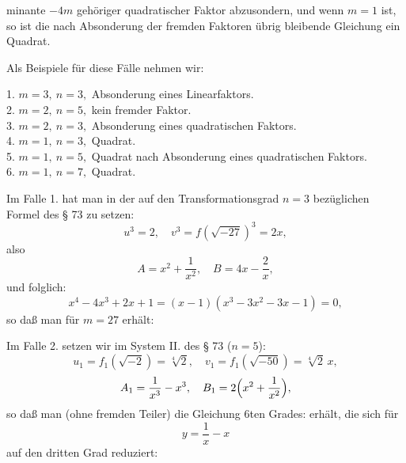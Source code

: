 minante $-4m$ gehöriger quadratischer Faktor abzusondern, und
wenn $m=1$ ist, so ist die nach Absonderung der fremden
Faktoren übrig bleibende Gleichung ein Quadrat.

Als Beispiele für diese Fälle nehmen wir:

1. \quad $m=3,\ n=3,$ \quad Absonderung eines Linearfaktors.\\
2. \quad $m=2,\ n=5,$ \quad kein fremder Faktor.\\
3. \quad $m=2,\ n=3,$ \quad Absonderung eines quadratischen Faktors.\\
4. \quad $m=1,\ n=3,$ \quad Quadrat.\\
5. \quad $m=1,\ n=5,$ \quad Quadrat nach Absonderung eines quadratischen Faktors.\\
6. \quad $m=1,\ n=7,$ \quad Quadrat.

Im Falle 1. hat man in der auf den Transformationsgrad $n=3$
bezüglichen Formel des § 73 zu setzen:
\[
u^3=2,\quad v^3=f(\sqrt{-27})^3=2x,
\]
also
\[
A=x^2+\frac{1}{x^2},\quad B=4x-\frac{2}{x},
\]
und folglich:
\[
x^4-4x^3+2x+1=(x-1)(x^3-3x^2-3x-1)=0,
\]
so daß man für $m=27$ erhält:

Im Falle 2. setzen wir im System II. des § 73 ($n=5$):
\[
u_1=f_1(\sqrt{-2})=\sqrt[4]{2},\quad v_1=f_1(\sqrt{-50})=\sqrt[4]{2}\,x,
\]
\[
A_1=\frac{1}{x^3}-x^3,\quad B_1=2\Bigl(x^2+\frac{1}{x^2}\Bigr),
\]
so daß man (ohne fremden Teiler) die Gleichung 6ten Grades:
erhält, die sich für
\[
y=\frac{1}{x}-x
\]
auf den dritten Grad reduziert:
